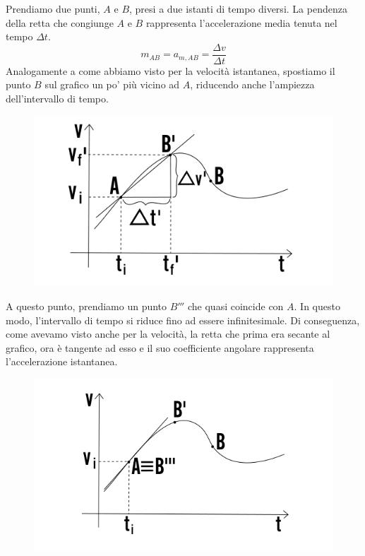 \documentclass[11pt]{article}
\begin{document}
Prendiamo due punti, $A$ e $B$, presi a due istanti di tempo diversi. La pendenza della retta che congiunge $A$ e $B$ rappresenta l'accelerazione media tenuta nel tempo $\Delta t$.
\begin{equation*}
m_{AB} = a_{m,AB} = \dfrac{\Delta v}{\Delta t}
\end{equation*}
Analogamente a come abbiamo visto per la velocità istantanea, spostiamo il punto $B$ sul grafico un po' più vicino ad $A$, riducendo anche l'ampiezza dell'intervallo di tempo.
\begin{figure}[H]
\label{grafico2accIst}
\includegraphics[scale=0.7]{accIst_2.png}
\centering
\end{figure}
A questo punto, prendiamo un punto $B'''$ che quasi coincide con $A$. In questo modo, l'intervallo di tempo si riduce fino ad essere infinitesimale. Di conseguenza, come avevamo visto anche per la velocità, la retta che prima era secante al grafico, ora è tangente ad esso e il suo coefficiente angolare rappresenta l'accelerazione istantanea.
\begin{figure}[H]
\label{}
\includegraphics[scale=0.7]{accIst_3.png}
\centering
\end{figure}
\end{document}
